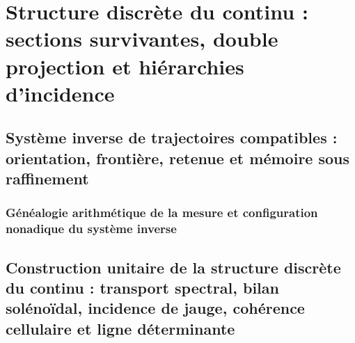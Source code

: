 

\part{Structure discrète du continu : sections survivantes, double projection et hiérarchies d'incidence}

\chapter{Système inverse de trajectoires compatibles : orientation, frontière, retenue et mémoire sous raffinement}
\label{chap:sucesor-102-04}
\label{owner:sucesor-102-04b-cadena-conjunta-inicio}
\section{Généalogie arithmétique de la mesure et configuration nonadique du système inverse}
\begin{HMTScientificOwnerSubordinated}

\end{HMTScientificOwnerSubordinated}















\chapter{Construction unitaire de la structure discrète du continu : transport spectral, bilan solénoïdal, incidence de jauge, cohérence cellulaire et ligne déterminante}
\label{chap:sucesor-102-05}
\label{owner:sucesor-102-04b1-04b2-unicos}












